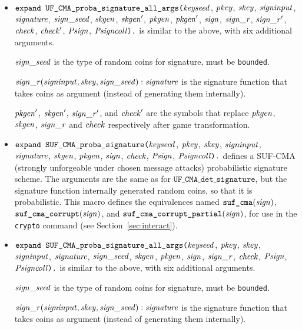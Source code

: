 \documentclass{article}
\begin{document}
\begin{itemize}
\item $\texttt{expand UF\_CMA\_proba\_signature\_all\_args(}\mathit{keyseed}$, $\mathit{pkey}$, $\mathit{skey}$,
$  \mathit{signinput}$, $\mathit{signature}$, $\mathit{sign\_seed}$, $\mathit{skgen}$, $\mathit{skgen}'$, $\mathit{pkgen}$, $\mathit{pkgen}'$, $\mathit{sign}$, $\mathit{sign\_r}$, $\mathit{sign\_r}'$, $\mathit{check}$, $\mathit{check}'$, $\mathit{Psign}$, $\mathit{Psigncoll}\texttt{).}$ is similar to the above,
  with six additional arguments. 

  $\mathit{sign\_seed}$ is the type of random coins for signature, must be \texttt{bounded}.

  $\mathit{sign\_r}(\mathit{signinput}, \mathit{skey}, \mathit{sign\_seed}): \mathit{signature}$ is the signature function that takes coins as argument (instead of generating them internally).

  $\mathit{pkgen}'$, $\mathit{skgen}'$, $\mathit{sign\_r}'$, and $\mathit{check}'$ are the symbols that replace $\mathit{pkgen}$, $\mathit{skgen}$, $\mathit{sign\_r}$ and $\mathit{check}$ respectively after game transformation.

\item $\texttt{expand SUF\_CMA\_proba\_signature(}\mathit{keyseed}$, $\mathit{pkey}$, $\mathit{skey}$,
$  \mathit{signinput}$, $\mathit{signature}$, $\mathit{skgen}$, $\mathit{pkgen}$, $\mathit{sign}$, $
  \mathit{check}$, $\mathit{Psign}$, $\mathit{Psigncoll}\texttt{).}$ defines a
  SUF-CMA (strongly unforgeable under chosen message attacks)
  probabilistic signature scheme.
  The arguments are the same as for $\texttt{UF\_CMA\_det\_signature}$,
  but the signature function internally generated random coins,
  so that it is probabilistic.
   This macro defines the equivalences named
   $\texttt{suf\_cma}(\mathit{sign})$,
   $\texttt{suf\_cma\_corrupt}(\mathit{sign})$, and
   $\texttt{suf\_cma\_corrupt\_partial}(\mathit{sign})$, for use in the
   \texttt{crypto} command (see Section~\ref{sec:interact}).

\item $\texttt{expand SUF\_CMA\_proba\_signature\_all\_args(}\mathit{keyseed}$, $\mathit{pkey}$, $\mathit{skey}$,
  $\mathit{signinput}$, $\mathit{signature}$, $\mathit{sign\_seed}$, $\mathit{skgen}$, $\mathit{pkgen}$, $\mathit{sign}$, $\mathit{sign\_r}$, $
  \mathit{check}$, $\mathit{Psign}$, $\mathit{Psigncoll}\texttt{).}$ is similar to the above,
  with six additional arguments. 

  $\mathit{sign\_seed}$ is the type of random coins for signature, must be \texttt{bounded}.

  $\mathit{sign\_r}(\mathit{signinput}, \mathit{skey}, \mathit{sign\_seed}): \mathit{signature}$ is the signature function that takes coins as argument (instead of generating them internally).


\end{itemize}
\end{document}

